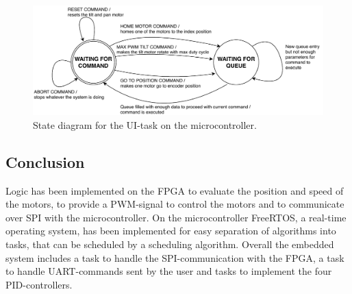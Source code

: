 \documentclass[../../main.tex]{subfiles}
\begin{document}
\begin{figure}[H]
    \centering
    \includegraphics[width=\textwidth]{Sections/System_Implementation/Images/UITaskStateDiagram.pdf}
    \caption{State diagram for the UI-task on the microcontroller.}
    \label{fig:UITaskStateDiagram}
\end{figure}




\subsection{Conclusion}

Logic has been implemented on the FPGA to evaluate the position and speed of the motors, to provide a PWM-signal to control the motors and to communicate over SPI with the microcontroller. On the microcontroller FreeRTOS, a real-time operating system, has been implemented for easy separation of algorithms into tasks, that can be scheduled by a scheduling algorithm. Overall the embedded system includes a task to handle the SPI-communication with the FPGA, a task to handle UART-commands sent by the user and tasks to implement the four PID-controllers.   
\end{document}
